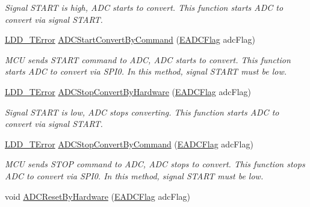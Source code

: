\begin{DoxyCompactItemize}
\begin{DoxyCompactList}\small\item\em Signal S\-T\-A\-R\-T is high, A\-D\-C starts to convert. This function starts A\-D\-C to convert via signal S\-T\-A\-R\-T. \end{DoxyCompactList}\item 
\hyperlink{group___p_e___types__module_ga24c2b045fd04e79e85f261ce4df35588}{L\-D\-D\-\_\-\-T\-Error} \hyperlink{group___a_d_c__module_ga7f6ee96c5b2a3d3466992aa468a5a27f}{A\-D\-C\-Start\-Convert\-By\-Command} (\hyperlink{group___enum_grp_ga7a77f876c6fae36cb97dfc3ba1e07665}{E\-A\-D\-C\-Flag} adc\-Flag)
\begin{DoxyCompactList}\small\item\em M\-C\-U sends S\-T\-A\-R\-T command to A\-D\-C, A\-D\-C starts to convert. This function starts A\-D\-C to convert via S\-P\-I0. In this method, signal S\-T\-A\-R\-T must be low. \end{DoxyCompactList}\item 
\hyperlink{group___p_e___types__module_ga24c2b045fd04e79e85f261ce4df35588}{L\-D\-D\-\_\-\-T\-Error} \hyperlink{group___a_d_c__module_gae7522edc164dc387abff35a130b268f7}{A\-D\-C\-Stop\-Convert\-By\-Hardware} (\hyperlink{group___enum_grp_ga7a77f876c6fae36cb97dfc3ba1e07665}{E\-A\-D\-C\-Flag} adc\-Flag)
\begin{DoxyCompactList}\small\item\em Signal S\-T\-A\-R\-T is low, A\-D\-C stops converting. This function starts A\-D\-C to convert via signal S\-T\-A\-R\-T. \end{DoxyCompactList}\item 
\hyperlink{group___p_e___types__module_ga24c2b045fd04e79e85f261ce4df35588}{L\-D\-D\-\_\-\-T\-Error} \hyperlink{group___a_d_c__module_ga2444bbfdc43b6d1dd3cf27d62b41db39}{A\-D\-C\-Stop\-Convert\-By\-Command} (\hyperlink{group___enum_grp_ga7a77f876c6fae36cb97dfc3ba1e07665}{E\-A\-D\-C\-Flag} adc\-Flag)
\begin{DoxyCompactList}\small\item\em M\-C\-U sends S\-T\-O\-P command to A\-D\-C, A\-D\-C stops to convert. This function stops A\-D\-C to convert via S\-P\-I0. In this method, signal S\-T\-A\-R\-T must be low. \end{DoxyCompactList}\item 
void \hyperlink{group___a_d_c__module_gaac2da2d21a0153782e5c806878c45605}{A\-D\-C\-Reset\-By\-Hardware} (\hyperlink{group___enum_grp_ga7a77f876c6fae36cb97dfc3ba1e07665}{E\-A\-D\-C\-Flag} adc\-Flag)

\end{DoxyCompactItemize}
